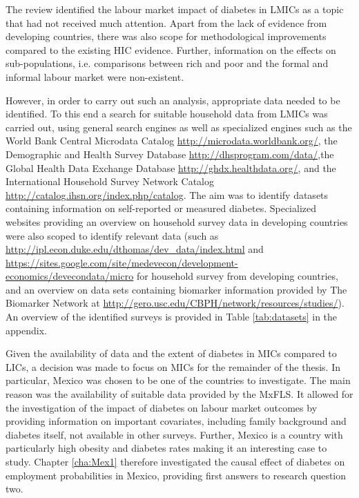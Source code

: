 The review identified the labour market impact of diabetes in \acp{LMIC} as a topic that had not received much attention. Apart from the lack of evidence from developing countries, there was also scope for methodological improvements compared to the existing \ac{HIC} evidence. Further, information on the effects on sub-populations, i.e. comparisons between rich and poor and the formal and informal labour market were non-existent.

However, in order to carry out such an analysis, appropriate data needed to be identified. To this end a search for suitable household data from \acp{LMIC} was carried out, using general search engines as well as specialized engines such as the World Bank Central Microdata Catalog  \url{http://microdata.worldbank.org/}, the Demographic and Health Survey Database \url{http://dhsprogram.com/data/},the Global Health Data Exchange Database \url{http://ghdx.healthdata.org/}, and the International Household Survey Network Catalog \url{http://catalog.ihsn.org/index.php/catalog}. The aim was to identify datasets containing information on self-reported or measured diabetes. Specialized websites providing an overview on household survey data in developing countries were also scoped to identify relevant data (such as \url{http://ipl.econ.duke.edu/dthomas/dev_data/index.html} and \url{https://sites.google.com/site/medevecon/development-economics/devecondata/micro} for household survey from developing countries, and an overview on data sets containing biomarker information provided by The Biomarker Network at \url{http://gero.usc.edu/CBPH/network/resources/studies/}). An overview of the identified surveys is provided in Table \ref{tab:datasets} in the appendix.

Given the availability of data and the extent of diabetes in \acp{MIC} compared to \acp{LIC}, a decision was made to focus on \acp{MIC} for the remainder of the thesis. In particular, Mexico was chosen to be one of the countries to investigate. The main reason was the availability of suitable  data provided by the \ac{MxFLS}. It allowed for the investigation of the impact of diabetes on labour market outcomes by providing information on important covariates, including family background and diabetes itself, not available in other surveys. Further, Mexico is a country with particularly high obesity and diabetes rates making it an interesting case to study. Chapter \ref{cha:Mex1} therefore investigated the causal effect of diabetes on employment probabilities in Mexico, providing first answers to research question two.

